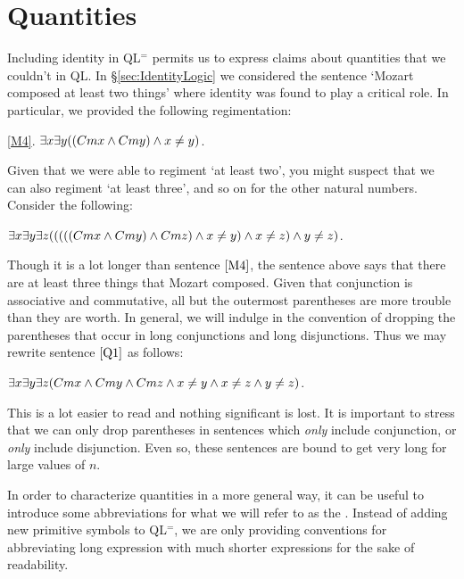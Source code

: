 \section{Quantities}
  \label{sec:Quantities}

Including identity in QL$^=$ permits us to express claims about quantities that we couldn't in QL.
In \S\ref{sec:IdentityLogic} we considered the sentence `Mozart composed at least two things' where identity was found to play a critical role.
In particular, we provided the following regimentation:

\begin{earg}
  \item[\ref{M4}.] $\exists x\exists y((Cmx \wedge Cmy) \wedge x\neq y)$.
\end{earg}

Given that we were able to regiment `at least two', you might suspect that we can also regiment `at least three', and so on for the other natural numbers.
Consider the following:

\begin{earg}
  \item[\ex{Q1}] $\exists x\exists y\exists z(((((Cmx \wedge Cmy) \wedge Cmz) \wedge x\neq y) \wedge x\neq z) \wedge y\neq z)$.
\end{earg}

Though it is a lot longer than sentence $\ref{M4}$, the sentence above says that there are at least three things that Mozart composed.
Given that conjunction is associative and commutative, all but the outermost parentheses are more trouble than they are worth.
In general, we will indulge in the convention of dropping the parentheses that occur in long conjunctions and long disjunctions.
Thus we may rewrite sentence $\ref{Q1}$ as follows:

\begin{earg}
  \item[\ex{Q2}] $\exists x\exists y\exists z(Cmx \wedge Cmy \wedge Cmz \wedge x\neq y \wedge x\neq z \wedge y\neq z)$.
\end{earg}

This is a lot easier to read and nothing significant is lost.
It is important to stress that we can only drop parentheses in sentences which \textit{only} include conjunction, or \textit{only} include disjunction.
Even so, these sentences are bound to get very long for large values of $n$.

In order to characterize quantities in a more general way, it can be useful to introduce some abbreviations for what we will refer to as the .
Instead of adding new primitive symbols to QL$^=$, we are only providing conventions for abbreviating long expression with much shorter expressions for the sake of readability.


